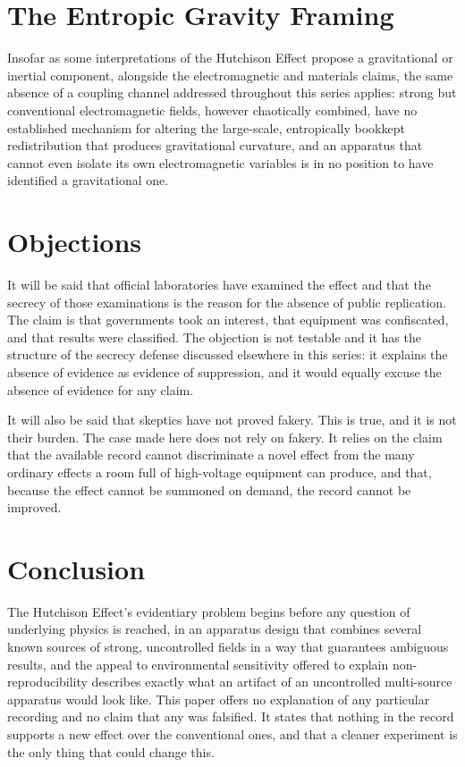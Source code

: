 \documentclass[11pt]{article}
\begin{document}
\section{The Entropic Gravity Framing}

Insofar as some interpretations of the Hutchison Effect propose a gravitational or inertial component, alongside the electromagnetic and materials claims, the same absence of a coupling channel addressed throughout this series applies: strong but conventional electromagnetic fields, however chaotically combined, have no established mechanism for altering the large-scale, entropically bookkept redistribution that produces gravitational curvature, and an apparatus that cannot even isolate its own electromagnetic variables is in no position to have identified a gravitational one.

\section{Objections}

It will be said that official laboratories have examined the effect and that the secrecy of those examinations is the reason for the absence of public replication. The claim is that governments took an interest, that equipment was confiscated, and that results were classified. The objection is not testable and it has the structure of the secrecy defense discussed elsewhere in this series: it explains the absence of evidence as evidence of suppression, and it would equally excuse the absence of evidence for any claim.

It will also be said that skeptics have not proved fakery. This is true, and it is not their burden. The case made here does not rely on fakery. It relies on the claim that the available record cannot discriminate a novel effect from the many ordinary effects a room full of high-voltage equipment can produce, and that, because the effect cannot be summoned on demand, the record cannot be improved.

\section{Conclusion}

The Hutchison Effect's evidentiary problem begins before any question of underlying physics is reached, in an apparatus design that combines several known sources of strong, uncontrolled fields in a way that guarantees ambiguous results, and the appeal to environmental sensitivity offered to explain non-reproducibility describes exactly what an artifact of an uncontrolled multi-source apparatus would look like. This paper offers no explanation of any particular recording and no claim that any was falsified. It states that nothing in the record supports a new effect over the conventional ones, and that a cleaner experiment is the only thing that could change this.
\end{document}
